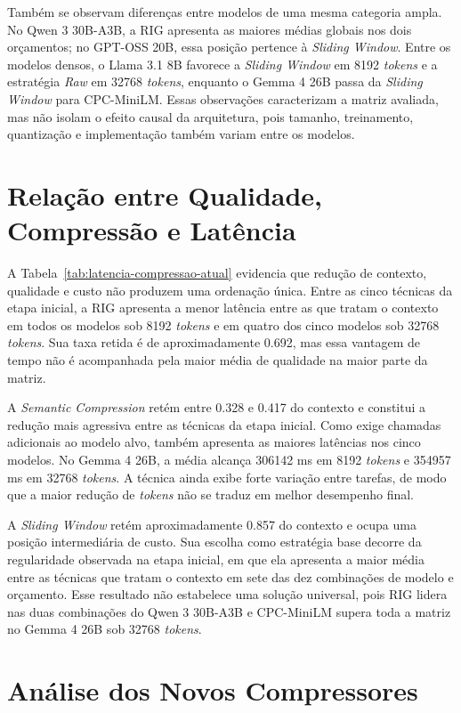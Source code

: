 Também se observam diferenças entre modelos de uma mesma categoria ampla. No Qwen 3 30B-A3B, a RIG apresenta as maiores médias globais nos dois orçamentos; no GPT-OSS 20B, essa posição pertence à \textit{Sliding Window}. Entre os modelos densos, o Llama 3.1 8B favorece a \textit{Sliding Window} em 8192 \textit{tokens} e a estratégia \textit{Raw} em 32768 \textit{tokens}, enquanto o Gemma 4 26B passa da \textit{Sliding Window} para CPC-MiniLM. Essas observações caracterizam a matriz avaliada, mas não isolam o efeito causal da arquitetura, pois tamanho, treinamento, quantização e implementação também variam entre os modelos.

\section{Relação entre Qualidade, Compressão e Latência}
\label{sec:acuracia-latencia}

A Tabela~\ref{tab:latencia-compressao-atual} evidencia que redução de contexto, qualidade e custo não produzem uma ordenação única. Entre as cinco técnicas da etapa inicial, a RIG apresenta a menor latência entre as que tratam o contexto em todos os modelos sob 8192 \textit{tokens} e em quatro dos cinco modelos sob 32768 \textit{tokens}. Sua taxa retida é de aproximadamente 0.692, mas essa vantagem de tempo não é acompanhada pela maior média de qualidade na maior parte da matriz.

A \textit{Semantic Compression} retém entre 0.328 e 0.417 do contexto e constitui a redução mais agressiva entre as técnicas da etapa inicial. Como exige chamadas adicionais ao modelo alvo, também apresenta as maiores latências nos cinco modelos. No Gemma 4 26B, a média alcança 306142 ms em 8192 \textit{tokens} e 354957 ms em 32768 \textit{tokens}. A técnica ainda exibe forte variação entre tarefas, de modo que a maior redução de \textit{tokens} não se traduz em melhor desempenho final.

A \textit{Sliding Window} retém aproximadamente 0.857 do contexto e ocupa uma posição intermediária de custo. Sua escolha como estratégia base decorre da regularidade observada na etapa inicial, em que ela apresenta a maior média entre as técnicas que tratam o contexto em sete das dez combinações de modelo e orçamento. Esse resultado não estabelece uma solução universal, pois RIG lidera nas duas combinações do Qwen 3 30B-A3B e CPC-MiniLM supera toda a matriz no Gemma 4 26B sob 32768 \textit{tokens}.

\section{Análise dos Novos Compressores}
\label{subsec:resultados-triagem-compressores}

